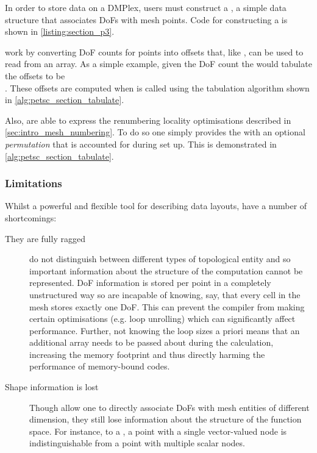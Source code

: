 \documentclass[thesis]{subfiles}
\begin{document}
In order to store data on a DMPlex, users must construct a , a simple data structure that associates DoFs with mesh points.
Code for constructing a  is shown in \cref{listing:section_p3}.

 work by converting DoF counts for points into offsets that, like \numpy{}, can be used to read from an array.
As a simple example, given the DoF count \ccode{[1, 0, 3, 2, 0, 1]} the  would tabulate the offsets to be\\
\ccode{[0, 1, 1, 4, 6, 6]}.
These offsets are computed when  is called using the tabulation algorithm shown in \cref{alg:petsc_section_tabulate}.

Also,  are able to express the renumbering locality optimisations described in \cref{sec:intro_mesh_numbering}.
To do so one simply provides the  with an optional \emph{permutation} that is accounted for during set up.
This is demonstrated in \cref{alg:petsc_section_tabulate}.

\subsubsection{Limitations}

Whilst a powerful and flexible tool for describing data layouts,  have a number of shortcomings:

\begin{description}
  \item[They are fully ragged]
     do not distinguish between different types of topological entity and so important information about the structure of the computation cannot be represented.
    DoF information is stored per point in a completely unstructured way so  are incapable of knowing, say, that every cell in the mesh stores exactly one DoF.
    This can prevent the compiler from making certain optimisations (e.g. loop unrolling) which can significantly affect performance.
    Further, not knowing the loop sizes a priori means that an additional array needs to be passed about during the calculation, increasing the memory footprint and thus directly harming the performance of memory-bound codes.

  \item[Shape information is lost]
    Though  allow one to directly associate DoFs with mesh entities of different dimension, they still lose information about the structure of the function space.
    For instance, to a , a point with a single vector-valued node is indistinguishable from a point with multiple scalar nodes.
\end{description}
\end{document}
